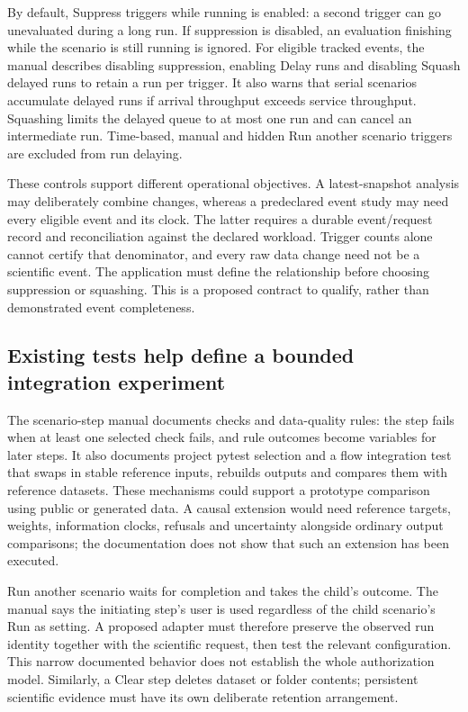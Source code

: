 By default, Suppress triggers while running is enabled: a second trigger can
go unevaluated during a long run. If suppression is disabled, an evaluation
finishing while the scenario is still running is ignored. For eligible tracked
events, the manual describes disabling suppression, enabling Delay runs and
disabling Squash delayed runs to retain a run per trigger. It also warns that
serial scenarios accumulate delayed runs if arrival throughput exceeds service
throughput. Squashing limits the delayed queue to at most one run and can
cancel an intermediate run. Time-based, manual and hidden Run another scenario
triggers are excluded from run delaying.
\citep{exec23_dss_latest_triggers}

These controls support different operational objectives. A latest-snapshot
analysis may deliberately combine changes, whereas a predeclared event study
may need every eligible event and its clock. The latter requires a durable
event/request record and reconciliation against the declared workload.
Trigger counts alone cannot certify that denominator, and every raw data
change need not be a scientific event. The application must define the
relationship before choosing suppression or squashing. This is a proposed
contract to qualify, rather than demonstrated event completeness.

\subsection{Existing tests help define a bounded integration experiment}

The scenario-step manual documents checks and data-quality rules: the step
fails when at least one selected check fails, and rule outcomes become
variables for later steps. It also documents project pytest selection and a
flow integration test that swaps in stable reference inputs, rebuilds outputs
and compares them with reference datasets. These mechanisms could support a
prototype comparison using public or generated data. A causal extension would
need reference targets, weights, information clocks, refusals and uncertainty
alongside ordinary output comparisons; the documentation does not show that
such an extension has been executed.
\citep{exec23_dss_latest_steps}

Run another scenario waits for completion and takes the child's outcome.
The manual says the initiating step's user is used regardless of the child
scenario's Run as setting. A proposed adapter must therefore preserve the
observed run identity together with the scientific request, then test the
relevant configuration. This narrow documented behavior does not establish
the whole authorization model. Similarly, a Clear step deletes dataset or
folder contents; persistent scientific evidence must have its own deliberate
retention arrangement.~\citep{exec23_dss_latest_steps}

